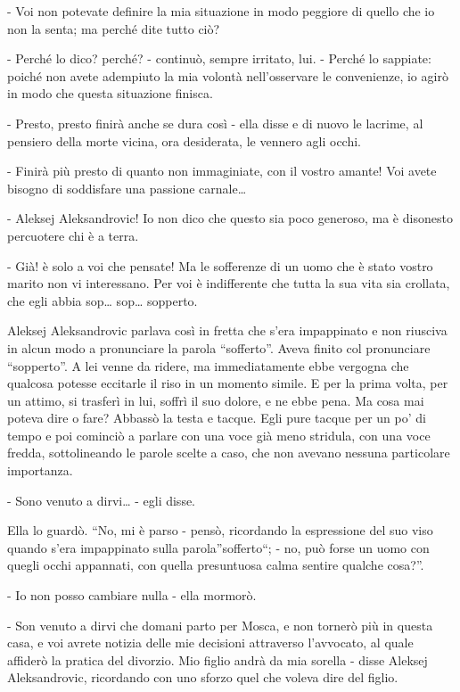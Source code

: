 - Voi non potevate definire la mia situazione in modo peggiore di quello che io non la senta; ma perché dite tutto ciò? 

- Perché lo dico? perché? - continuò, sempre irritato, lui. - Perché lo sappiate: poiché non avete adempiuto la mia volontà nell'osservare le convenienze, io agirò in modo che questa situazione finisca. 

- Presto, presto finirà anche se dura così - ella disse e di nuovo le lacrime, al pensiero della morte vicina, ora desiderata, le vennero agli occhi. 

- Finirà più presto di quanto non immaginiate, con il vostro amante! Voi avete bisogno di soddisfare una passione carnale\ldots{} 

- Aleksej Aleksandrovic! Io non dico che questo sia poco generoso, ma è disonesto percuotere chi è a terra. 

- Già! è solo a voi che pensate! Ma le sofferenze di un uomo che è stato vostro marito non vi interessano. Per voi è indifferente che tutta la sua vita sia crollata, che egli abbia sop\ldots{} sop\ldots{} sopperto. 

Aleksej Aleksandrovic parlava così in fretta che s'era impappinato e non riusciva in alcun modo a pronunciare la parola ``sofferto''. Aveva finito col pronunciare ``sopperto''. A lei venne da ridere, ma immediatamente ebbe vergogna che qualcosa potesse eccitarle il riso in un momento simile. E per la prima volta, per un attimo, si trasferì in lui, soffrì il suo dolore, e ne ebbe pena. Ma cosa mai poteva dire o fare? Abbassò la testa e tacque. Egli pure tacque per un po' di tempo e poi cominciò a parlare con una voce già meno stridula, con una voce fredda, sottolineando le parole scelte a caso, che non avevano nessuna particolare importanza. 

- Sono venuto a dirvi\ldots{} - egli disse. 

Ella lo guardò. ``No, mi è parso - pensò, ricordando la espressione del suo viso quando s'era impappinato sulla parola''sofferto``; - no, può forse un uomo con quegli occhi appannati, con quella presuntuosa calma sentire qualche cosa?''. 

- Io non posso cambiare nulla - ella mormorò. 

- Son venuto a dirvi che domani parto per Mosca, e non tornerò più in questa casa, e voi avrete notizia delle mie decisioni attraverso l'avvocato, al quale affiderò la pratica del divorzio. Mio figlio andrà da mia sorella - disse Aleksej Aleksandrovic, ricordando con uno sforzo quel che voleva dire del figlio. 

